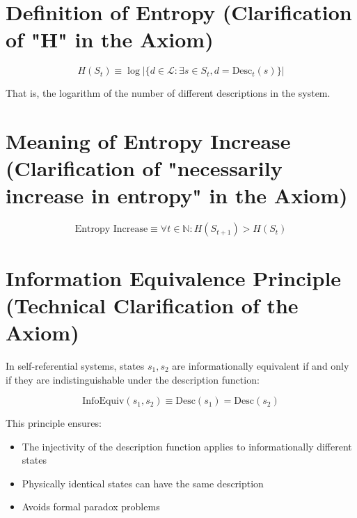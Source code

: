 \section{Definition of Entropy (Clarification of "H" in the Axiom)}
\label{sec:ch02_axiom:definition-of-entropy-clarification-of-h-in-the-axiom}

\begin{equation}
H(S_t) \equiv \log |\{d \in \mathcal{L}: \exists s \in S_t, d = \text{Desc}_t(s)\}|
\end{equation}

That is, the logarithm of the number of different descriptions in the system.

\section{Meaning of Entropy Increase (Clarification of "necessarily increase in entropy" in the Axiom)}
\label{sec:ch02_axiom:meaning-of-entropy-increase-clarification-of-necessarily-increase-in-entropy-in-the-axiom}

\begin{equation}
\text{Entropy Increase} \equiv \forall t \in \mathbb{N}: H(S_{t+1}) > H(S_t)
\end{equation}

\section{Information Equivalence Principle (Technical Clarification of the Axiom)}
\label{sec:ch02_axiom:information-equivalence-principle-technical-clarification-of-the-axiom}

In self-referential systems, states $s_1, s_2$ are informationally equivalent if and only if they are indistinguishable under the description function:

\begin{equation}
\text{InfoEquiv}(s_1, s_2) \equiv \text{Desc}(s_1) = \text{Desc}(s_2)
\end{equation}

This principle ensures:
\begin{itemize}
\item The injectivity of the description function applies to informationally different states
\item Physically identical states can have the same description
\item Avoids formal paradox problems
\end{itemize}

